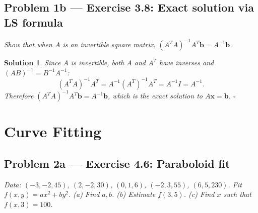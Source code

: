 \documentclass[11pt,a4paper]{article}
\theoremstyle{sol}
\newtheorem*{solution}{Solution}
\begin{document}
\clearpage
\subsection*{Problem 1b --- Exercise 3.8: Exact solution via LS formula}
\textit{Show that when $A$ is an invertible square matrix, $(A^TA)^{-1}A^T\mathbf{b}=A^{-1}\mathbf{b}$.}

\begin{solution}
Since $A$ is invertible, both $A$ and $A^T$ have inverses and $(AB)^{-1}=B^{-1}A^{-1}$:
\[
(A^TA)^{-1}A^T = A^{-1}(A^T)^{-1}A^T = A^{-1}I = A^{-1}.
\]
Therefore $(A^TA)^{-1}A^T\mathbf{b}=A^{-1}\mathbf{b}$, which is the exact solution to $A\mathbf{x}=\mathbf{b}$. $\square$
\end{solution}

\clearpage
\section{Curve Fitting}

\subsection*{Problem 2a --- Exercise 4.6: Paraboloid fit}
\textit{Data: $(-3,-2,45)$, $(2,-2,30)$, $(0,1,6)$, $(-2,3,55)$, $(6,5,230)$. Fit $f(x,y)=ax^2+by^2$.
(a) Find $a,b$. (b) Estimate $f(3,5)$. (c) Find $x$ such that $f(x,3)=100$.}
\end{document}
